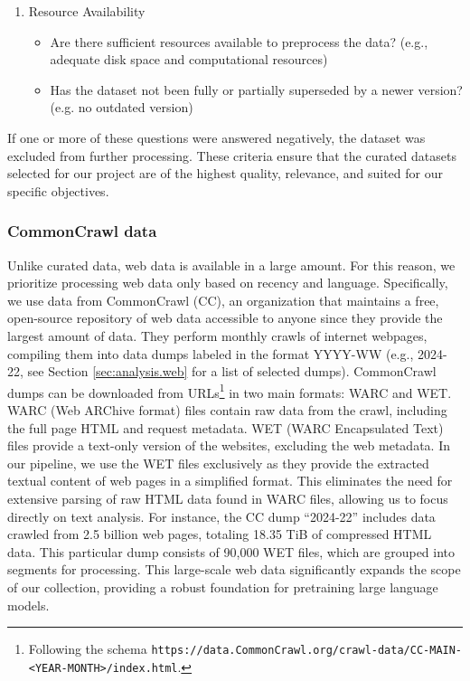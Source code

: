 \begin{enumerate}
    \item Resource Availability
    
    \begin{itemize}
        \item Are there sufficient resources available to preprocess the data? 
        (e.g., adequate disk space and computational resources)
        \item Has the dataset not been fully or partially superseded by a newer version?
        (e.g. no outdated version)
    \end{itemize}

\end{enumerate}

If one or more of these questions were answered negatively, the dataset was excluded from further processing. These criteria ensure that the curated datasets selected for our project are of the highest quality, relevance, and suited for our specific objectives.

\subsubsection{CommonCrawl data}
\label{sec:datasets.selection.cc}

Unlike curated data, web data is available in a large amount. For this reason, we prioritize processing web data only based on recency and language. Specifically, we use data from CommonCrawl (CC), an organization that maintains a free, open-source repository of web data accessible to anyone since they provide the largest amount of data. They perform monthly crawls of internet webpages, compiling them into data dumps labeled in the format YYYY-WW (e.g., 2024-22, see Section \ref{sec:analysis.web} for a list of selected dumps). 
CommonCrawl dumps can be downloaded from URLs\footnote{Following the schema \texttt{https://data.CommonCrawl.org/crawl-data/CC-MAIN-<YEAR-MONTH>/index.html}.} in two main formats: WARC and WET. WARC (Web ARChive format) files contain raw data from the crawl, including the full page HTML and request metadata. WET (WARC Encapsulated Text) files provide a text-only version of the websites, excluding the web metadata.
In our pipeline, we use the WET files exclusively as they provide the extracted textual content of web pages in a simplified format. This eliminates the need for extensive parsing of raw HTML data found in WARC files, allowing us to focus directly on text analysis. For instance, the CC dump ``2024-22'' includes data crawled from 2.5 billion web pages, totaling 18.35 TiB of compressed HTML data. This particular dump consists of 90,000 WET files, which are grouped into segments for processing. This large-scale web data significantly expands the scope of our collection, providing a robust foundation for pretraining large language models.


